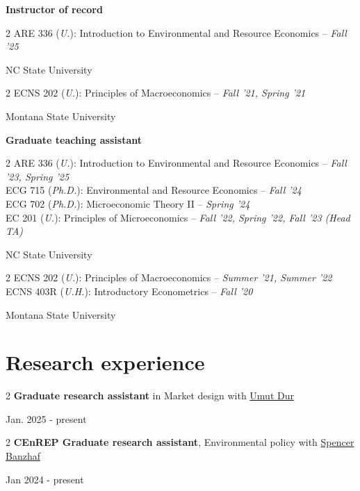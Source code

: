 \documentclass[11pt]{article}
\newenvironment{twocolentry}[2][]{
	\onecolentry
	\def\secondColumn{#2}
	\setcolumnwidth{\fill, 4.5 cm}
	\begin{paracol}{2}
	}{
		\switchcolumn \raggedleft \secondColumn
	\end{paracol}
	\endonecolentry
} %
\begin{document}
\textbf{Instructor of record}

\begin{twocolentry}{NC State University}\footnotesize
	ARE 336 (\textit{U.}): Introduction to Environmental and Resource Economics
	-- \textit{Fall '25}
\end{twocolentry}
\begin{twocolentry}{Montana State University}\footnotesize
	ECNS 202 (\textit{U.}): Principles of Macroeconomics
	-- \textit{Fall '21, Spring '21}
\end{twocolentry}

\vspace{0.10 cm}

\textbf{Graduate teaching assistant}

\begin{twocolentry}{NC State University}\footnotesize
	ARE 336 (\textit{U.}): Introduction to Environmental and Resource Economics
	-- \textit{Fall '23, Spring '25} \\
	ECG 715 (\textit{Ph.D.}): Environmental and Resource Economics
	-- \textit{Fall '24} \\
	ECG 702 (\textit{Ph.D.}): Microeconomic Theory II
	-- \textit{Spring '24} \\
	EC 201 (\textit{U.}): Principles of Microeconomics
	-- \textit{Fall '22, Spring '22, Fall '23 (Head TA)}
\end{twocolentry}
\begin{twocolentry}{Montana State University}\footnotesize
	ECNS 202 (\textit{U.}): Principles of Macroeconomics
	-- \textit{Summer '21, Summer '22} \\
	ECNS 403R (\textit{U.H.}): Introductory Econometrics
	-- \textit{Fall '20}
\end{twocolentry}

\section{Research experience}

\begin{twocolentry}{Jan. 2025 - present}\footnotesize
	\textbf{Graduate research assistant} in Market design with \href{https://sites.google.com/site/umutdur/home}{Umut Dur}
\end{twocolentry}

\begin{twocolentry}{Jan 2024 - present}\footnotesize
	\textbf{CEnREP Graduate research assistant},
	Environmental policy with \href{https://spencerbanzhaf.wordpress.ncsu.edu/}{Spencer Banzhaf}
\end{twocolentry}
\end{document}

